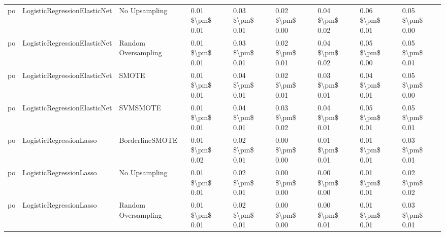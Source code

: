 \begin{tabular}{lllllllll}
      po &    LogisticRegressionElasticNet &                 No Upsampling & 0.01 \$\textbackslash pm\$ 0.01 &           0.03 \$\textbackslash pm\$ 0.01 &       0.02 \$\textbackslash pm\$ 0.00 &        0.04 \$\textbackslash pm\$ 0.02 &                         0.06 \$\textbackslash pm\$ 0.01 &     0.05 \$\textbackslash pm\$ 0.00 \\
      po &    LogisticRegressionElasticNet &           Random Oversampling & 0.01 \$\textbackslash pm\$ 0.01 &           0.03 \$\textbackslash pm\$ 0.01 &       0.02 \$\textbackslash pm\$ 0.01 &        0.04 \$\textbackslash pm\$ 0.02 &                         0.05 \$\textbackslash pm\$ 0.00 &     0.05 \$\textbackslash pm\$ 0.01 \\
      po &    LogisticRegressionElasticNet &                         SMOTE & 0.01 \$\textbackslash pm\$ 0.01 &           0.04 \$\textbackslash pm\$ 0.01 &       0.02 \$\textbackslash pm\$ 0.01 &        0.03 \$\textbackslash pm\$ 0.01 &                         0.04 \$\textbackslash pm\$ 0.01 &     0.05 \$\textbackslash pm\$ 0.00 \\
      po &    LogisticRegressionElasticNet &                      SVMSMOTE & 0.01 \$\textbackslash pm\$ 0.01 &           0.04 \$\textbackslash pm\$ 0.01 &       0.03 \$\textbackslash pm\$ 0.02 &        0.04 \$\textbackslash pm\$ 0.01 &                         0.05 \$\textbackslash pm\$ 0.01 &     0.05 \$\textbackslash pm\$ 0.01 \\
      po &         LogisticRegressionLasso &               BorderlineSMOTE & 0.01 \$\textbackslash pm\$ 0.02 &           0.02 \$\textbackslash pm\$ 0.01 &       0.00 \$\textbackslash pm\$ 0.00 &        0.01 \$\textbackslash pm\$ 0.01 &                         0.01 \$\textbackslash pm\$ 0.01 &     0.03 \$\textbackslash pm\$ 0.01 \\
      po &         LogisticRegressionLasso &                 No Upsampling & 0.01 \$\textbackslash pm\$ 0.01 &           0.02 \$\textbackslash pm\$ 0.01 &       0.00 \$\textbackslash pm\$ 0.00 &        0.00 \$\textbackslash pm\$ 0.00 &                         0.01 \$\textbackslash pm\$ 0.01 &     0.02 \$\textbackslash pm\$ 0.02 \\
      po &         LogisticRegressionLasso &           Random Oversampling & 0.01 \$\textbackslash pm\$ 0.01 &           0.02 \$\textbackslash pm\$ 0.01 &       0.00 \$\textbackslash pm\$ 0.00 &        0.00 \$\textbackslash pm\$ 0.01 &                         0.01 \$\textbackslash pm\$ 0.01 &     0.03 \$\textbackslash pm\$ 0.01 \\

\end{tabular}
